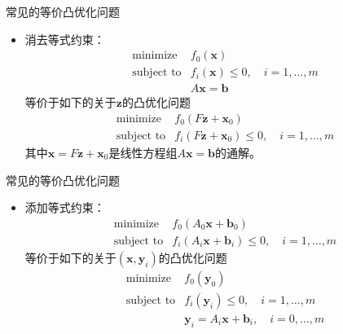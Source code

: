 \begin{frame}

\begin{block}{常见的等价凸优化问题}
\begin{itemize}
\item 消去等式约束：
\begin{eqnarray*}
& \text{minimize} & f_0(\mathbf{x}) \\
& \text{subject to} & f_i(\mathbf{x}) \le 0, \quad i = 1,\ldots,m \\
& & A\mathbf{x} = \mathbf{b}
\end{eqnarray*}
等价于如下的关于$\mathbf{z}$的凸优化问题
\begin{eqnarray*}
& \text{minimize} & f_0(F\mathbf{z} + \mathbf{x}_0) \\
& \text{subject to} & f_i(F\mathbf{z} + \mathbf{x}_0) \le 0, \quad i = 1,\ldots,m
\end{eqnarray*}
其中$\mathbf{x} = F\mathbf{z} + \mathbf{x}_0$是线性方程组$A\mathbf{x} = \mathbf{b}$的通解。
\end{itemize}
\end{block}

\end{frame}


\begin{frame}

\begin{block}{常见的等价凸优化问题}
\begin{itemize}
\item 添加等式约束：
\begin{eqnarray*}
& \text{minimize} & f_0(A_0\mathbf{x} + \mathbf{b}_0) \\
& \text{subject to} & f_i(A_i\mathbf{x} + \mathbf{b}_i) \le 0, \quad i = 1,\ldots,m
\end{eqnarray*}
等价于如下的关于$(\mathbf{x},\mathbf{y}_i)$的凸优化问题
\begin{eqnarray*}
& \text{minimize} & f_0(\mathbf{y}_0) \\
& \text{subject to} & f_i(\mathbf{y}_i) \le 0, \quad i = 1,\ldots,m \\
& & \mathbf{y}_i = A_i\mathbf{x} + \mathbf{b}_i, \quad i = 0,\ldots,m
\end{eqnarray*}
\end{itemize}
\end{block}

\end{frame}

